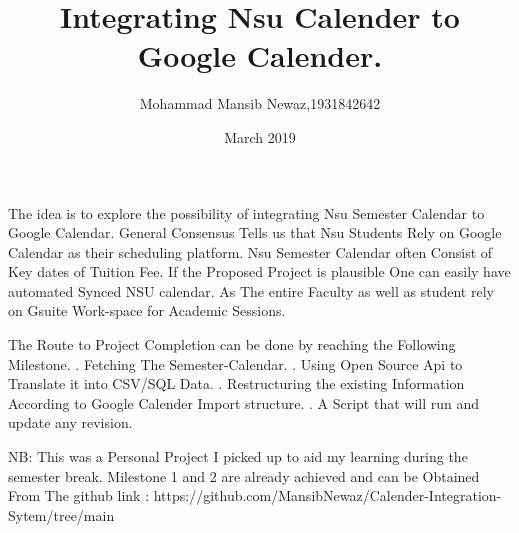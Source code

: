 \documentclass[12pt]{extarticle}
\title{Integrating Nsu Calender to Google Calender.}
\author{Mohammad Mansib Newaz,1931842642}
\date{March 2019}
\begin{document}
\maketitle
The idea is to explore the possibility of integrating Nsu Semester Calendar to Google Calendar. 
General Consensus Tells us that Nsu Students Rely on Google Calendar as their scheduling platform. Nsu Semester Calendar often Consist of Key dates of Tuition Fee. If the Proposed Project is plausible One can easily have automated Synced NSU calendar. As The entire Faculty as well as student rely on Gsuite Work-space for Academic Sessions. 

The Route to Project Completion can be done by reaching the Following Milestone. 
\newline \newline
{}. Fetching The Semester-Calendar.
. Using Open Source Api to Translate it into CSV/SQL Data. 
. Restructuring the existing Information According to Google Calender Import structure. 
. A Script that will run and update any revision. 
 

  \newline \newline NB: This was a Personal Project I picked up to aid my learning during the semester break. Milestone 1 and 2 are already achieved and can be Obtained From The github link : https://github.com/MansibNewaz/Calender-Integration-Sytem/tree/main
\end{document}
